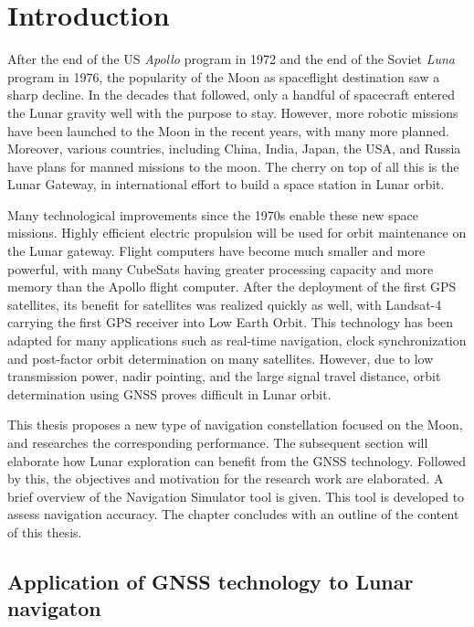 \chapter{Introduction}
\label{ch:intro}

After the end of the US \textit{Apollo} program in 1972 and the end of the Soviet \textit{Luna} program in 1976, the popularity of the Moon as spaceflight destination saw a sharp decline. 
In the decades that followed, only a handful of spacecraft entered the Lunar gravity well with the purpose to stay. However, more robotic missions have been launched to the Moon in the recent years, with many more planned. 
Moreover, various countries, including China, India, Japan, the USA, and Russia have plans for manned missions to the moon. 
The cherry on top of all this is the Lunar Gateway, in international effort to build a space station in Lunar orbit.

Many technological improvements since the 1970s enable these new space missions. 
Highly efficient electric propulsion will be used for orbit maintenance on the Lunar gateway. 
Flight computers have become much smaller and more powerful, with many CubeSats having greater processing capacity and more memory than the Apollo flight computer. 
After the deployment of the first GPS satellites, its benefit for satellites was realized quickly as well, with Landsat-4 carrying the first GPS receiver into Low Earth Orbit. 
This technology has been adapted for many applications such as real-time navigation, clock synchronization and post-factor orbit determination on many satellites.
However, due to low transmission power, nadir pointing, and the large signal travel distance, orbit determination using GNSS proves difficult in Lunar orbit.

This thesis proposes a new type of navigation constellation focused on the Moon, and researches the corresponding performance. 
The subsequent section will elaborate how Lunar exploration can benefit from the GNSS technology. 
Followed by this, the objectives and motivation for the research work are elaborated. 
A brief overview of the Navigation Simulator tool is given. 
This tool is developed to assess navigation accuracy.
The chapter concludes with an outline of the content of this thesis.


\section{Application of GNSS technology to Lunar navigaton}


